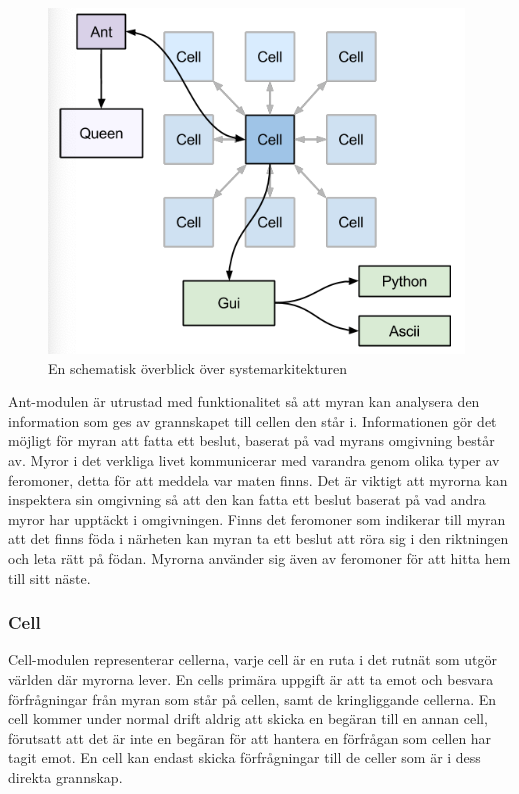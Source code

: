 \documentclass[12pt]{article}
\begin{document}
\begin{figure}
    \centering
    \includegraphics[width=\textwidth]{BugsLife-Fig2.png}
    \caption{En schematisk överblick över systemarkitekturen}\label{fig:sysark-overview}
\end{figure}

Ant-modulen är utrustad med funktionalitet så att myran kan analysera den information som ges av grannskapet till cellen den står i.
Informationen gör det möjligt för myran att fatta ett beslut,
baserat på vad myrans omgivning består av.
Myror i det verkliga livet kommunicerar med varandra genom olika typer av feromoner,
detta för att meddela var maten finns.
Det är viktigt att myrorna kan inspektera sin omgivning så att den kan fatta ett beslut baserat på vad andra myror har upptäckt i omgivningen.
Finns det feromoner som indikerar till myran att det finns föda i närheten kan myran ta ett beslut att röra sig i den riktningen och leta rätt på födan.
Myrorna använder sig även av feromoner för att hitta hem till sitt näste.

\subsubsection{Cell}
Cell-modulen representerar cellerna,
varje cell är en ruta i det rutnät som utgör världen där myrorna lever.
En cells primära uppgift är att ta emot och besvara förfrågningar från myran som står på cellen,
samt de kringliggande cellerna.
En cell kommer under normal drift aldrig att skicka en begäran till en annan cell,
förutsatt att det är inte en begäran för att hantera en förfrågan som cellen har tagit emot.
En cell kan endast skicka förfrågningar till de celler som är i dess direkta grannskap.
\end{document}
